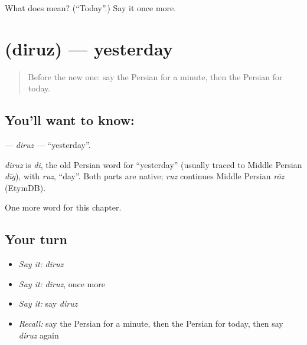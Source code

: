 \begin{tcolorbox}[breakable,colback=teal!4,colframe=teal!35!black,title={Before you move on}]
What does  mean? (\textquotedblleft{}Today\textquotedblright{}.) Say it once more.
\end{tcolorbox}
\section[\texorpdfstring{\fa{دیروز} (diruz)}{دیروز (diruz)}]{ (diruz) — yesterday}

\label{lesson:FA-C65-diruz}



\begin{quote}
Before the new one: say the Persian for a minute, then the Persian for today.
\end{quote}

\subsection*{You'll want to know: }
\textbf{} — \emph{diruz} — \textquotedblleft{}yesterday\textquotedblright{}.

\begin{cousinweb}
\emph{diruz} is \emph{di}, the old Persian word for \textquotedblleft{}yesterday\textquotedblright{} (usually traced to Middle Persian \emph{dīg}), with \emph{ruz}, \textquotedblleft{}day\textquotedblright{}. Both parts are native; \emph{ruz} continues Middle Persian \emph{rōz} (EtymDB).
\end{cousinweb}

\begin{grammarlens}[title={What you've built}]
One more word for this chapter.
\end{grammarlens}

\subsection*{Your turn}
\begin{itemize}
\raggedright
  \item \emph{Say it:} \emph{diruz}
  \item \emph{Say it:} \emph{diruz}, once more
  \item \emph{Say it:} say \emph{diruz}
  \item \emph{Recall:} say the Persian for a minute, then the Persian for today, then say \emph{diruz} again
\end{itemize}

